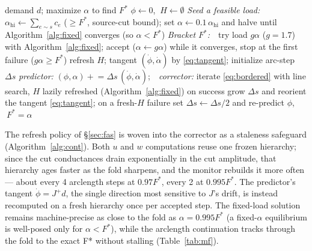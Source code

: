 \documentclass{siamart220329}
\begin{document}
\begin{algorithm}[t]
\caption{NLF arclength continuation (max-flow fold).}
\label{alg:cont}
\begin{algorithmic}[1]
\Require demand $d$; maximize $\alpha$ to find $F^*$ 
\State $\phi \gets 0$, $\ H \gets \emptyset$ 
\State \emph{Seed a feasible load:}\ \ $\alpha_{\mathrm{hi}} \gets \sum_{e\sim s}c_e$ ($\ge F^*$, source-cut bound); set $\alpha\gets 0.1\,\alpha_{\mathrm{hi}}$ and halve until Algorithm~\ref{alg:fixed} converges (so $\alpha<F^*$)
\State \emph{Bracket $F^*$:}\ \ try load $g\alpha$ ($g{=}1.7$) with Algorithm~\ref{alg:fixed}; accept ($\alpha\gets g\alpha$) while it converges, stop at the first failure ($g\alpha\ge F^*$)
\State refresh $H$; tangent $(\dot\phi,\dot\alpha)$ by \eqref{eq:tangent}; initialize arc-step $\Delta s$
 
  \State \emph{predictor:} $(\phi,\alpha)\mathrel{+}= \Delta s\,(\dot\phi,\dot\alpha)$;\ \ \emph{corrector:} iterate \eqref{eq:bordered} with line search, $H$ lazily refreshed (Algorithm~\ref{alg:fixed})
  \State on success grow $\Delta s$ and reorient the tangent \eqref{eq:tangent}; on a fresh-$H$ failure set $\Delta s\gets\Delta s/2$ and re-predict
\EndWhile
\State \Return $\phi$, $\ F^* = \alpha$
\end{algorithmic}
\end{algorithm}

The refresh policy of \S\ref{sec:fas} is woven into the corrector as a staleness safeguard (Algorithm~\ref{alg:cont}). Both $u$ and $w$ computations reuse one frozen hierarchy; since the cut conductances drain exponentially in the cut amplitude, that hierarchy ages faster as the fold sharpens, and the monitor rebuilds it more often — about every 4 arclength steps at $0.97 F^*$, every 2 at $0.995 F^*$. The predictor's tangent $\dot\phi = J^{+}d$, the single direction most sensitive to $J$'s drift, is instead recomputed on a fresh hierarchy once per accepted step. The fixed-load solution remains machine-precise as close to the fold as $\alpha = 0.995 F^*$ (a fixed-$\alpha$ equilibrium is well-posed only for $\alpha < F^*$), while the arclength continuation tracks through the fold to the exact F* without stalling (Table~\ref{tab:mf}).
\end{document}
